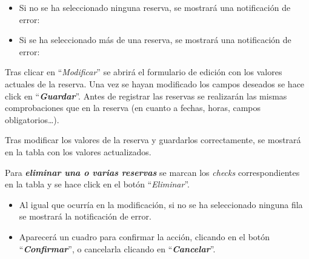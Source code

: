 \begin{itemize}
    \item Si no se ha seleccionado ninguna reserva, se mostrará una notificación de error:
    
    
    \item Si se ha seleccionado más de una reserva, se mostrará una notificación de error:
    
\end{itemize}


Tras clicar en ``\textit{Modificar}'' se abrirá el formulario de edición con los valores actuales de la reserva. Una vez se hayan modificado los campos deseados se hace click en ``\textbf{\textit{Guardar}}''. Antes de registrar las reservas se realizarán las mismas comprobaciones que en la reserva (en cuanto a fechas, horas, campos obligatorios\dots).


Tras modificar los valores de la reserva y guardarlos correctamente, se mostrará en la tabla con los valores actualizados.


Para \textbf{\textit{eliminar una o varias reservas}} se marcan los \textit{checks} correspondientes en la tabla y se hace click en el botón ``\textit{Eliminar}''. 

\begin{itemize}
    \item Al igual que ocurría en la modificación, si no se ha seleccionado ninguna fila se mostrará la notificación de error.
    
    \item Aparecerá un cuadro para confirmar la acción, clicando en el botón  ``\textbf{\textit{Confirmar}}'', o cancelarla clicando en ``\textbf{\textit{Cancelar}}''.
        
\end{itemize}

